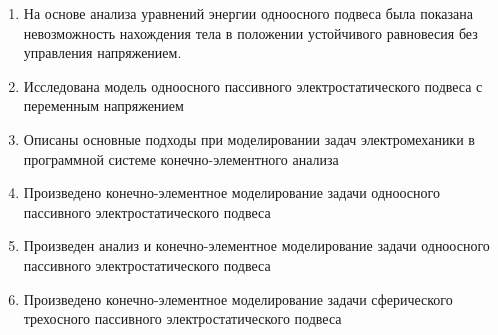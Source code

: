 \begin{enumerate}
  \item На основе анализа уравнений энергии одноосного подвеса была показана невозможность нахождения тела в положении устойчивого равновесия без управления напряжением.
  \item Исследована модель одноосного пассивного электростатического подвеса с переменным напряжением
  \item Описаны основные подходы при моделировании задач электромеханики в программной системе конечно-элементного анализа
  \item Произведено конечно-элементное моделирование задачи одноосного пассивного электростатического подвеса
  \item Произведен анализ и конечно-элементное моделирование задачи одноосного пассивного электростатического подвеса
  \item Произведено конечно-элементное моделирование задачи сферического трехосного пассивного электростатического подвеса
\end{enumerate}
